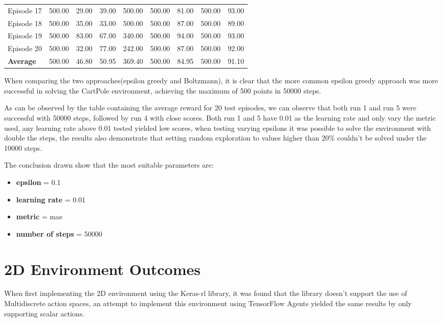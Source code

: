 \begin{table}[H]
\begin{tabular}{l|l|l|l|l|l|l|l|l|}
 \multicolumn{1}{|l|}{Episode 17} & 500.00 & 29.00 & 39.00 & 500.00 & 500.00 & 81.00& 500.00 & 93.00\\
 \multicolumn{1}{|l|}{Episode 18} & 500.00 & 35.00 & 33.00 & 500.00 & 500.00 & 87.00& 500.00 & 89.00\\
 \multicolumn{1}{|l|}{Episode 19} & 500.00 & 83.00 & 67.00 & 340.00 & 500.00 & 94.00& 500.00 & 93.00\\
 \multicolumn{1}{|l|}{Episode 20} & 500.00 & 32.00 & 77.00 & 242.00 & 500.00 & 87.00& 500.00 & 92.00\\ \hline
 \multicolumn{1}{|l|}{\textbf{Average}} & 500.00 & 46.80 & 50.95 & 369.40 & 500.00 & 84.95 & 500.00 &91.10 \\
 \hline
 \end{tabular}
 \end{table}

 When comparing the two approaches(epsilon greedy and Boltzmann), it is clear that the more common epsilon greedy approach was more successful in solving the CartPole environment, achieving the maximum of 500 points in 50000 steps.

 As can be observed by the table containing the average reward for 20 test episodes, we can observe that both run 1 and run 5 were successful with 50000 steps, followed by run 4 with close scores.
 Both run 1 and 5 have 0.01 as the learning rate and only vary the metric used, any learning rate above 0.01 tested yielded low scores, when testing varying epsilons it was possible to solve the environment with double the steps, 
 the results also demonstrate that setting random exploration to values higher than 20\% couldn't be solved under the 10000 steps.

 The conclusion drawn show that the most suitable parameters are:
 \begin{itemize}
 \item \textbf{epsilon} = 0.1
 \item \textbf{learning rate} = 0.01
 \item \textbf{metric} = mae
 \item \textbf{number of steps} = 50000
 \end{itemize}
 
 \section{2D Environment Outcomes}
When first implementing the 2D environment using the Keras-rl library, it was found that the library doesn't support the use of Multidiscrete action spaces, 
an attempt to implement this environment using TensorFlow Agents yielded the same results by only supporting scalar actions.

